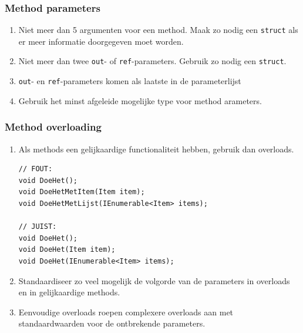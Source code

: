 \documentclass[a4paper,11pt]{article}
\begin{document}
\subsubsection{Method parameters}
\begin{enumerate}[resume]
\item Niet meer dan 5 argumenten voor een method.  Maak zo nodig een \lstinline !struct! als
er meer informatie doorgegeven moet worden.
\item Niet meer dan twee \lstinline !out!- of 
\lstinline !ref!-parameters.  Gebruik zo nodig een \lstinline !struct!.
\item \lstinline !out!- en \lstinline !ref!-parameters komen als laatste
in de parameterlijst
\item Gebruik het minst afgeleide mogelijke type voor method arameters.
\end{enumerate}

\subsubsection{Method overloading}
\begin{enumerate}[resume]
\item Als methods een gelijkaardige functionaliteit hebben, gebruik dan
overloads.
\begin{lstlisting}
// FOUT:
void DoeHet();
void DoeHetMetItem(Item item);
void DoeHetMetLijst(IEnumerable<Item> items);

// JUIST:
void DoeHet();
void DoeHet(Item item);
void DoeHet(IEnumerable<Item> items);
\end{lstlisting}
\item Standaardiseer zo veel mogelijk de volgorde van de parameters in
overloads en in gelijkaardige methods.
\item Eenvoudige overloads roepen complexere overloads aan met
standaardwaarden voor de ontbrekende parameters.

\end{enumerate}
\end{document}
